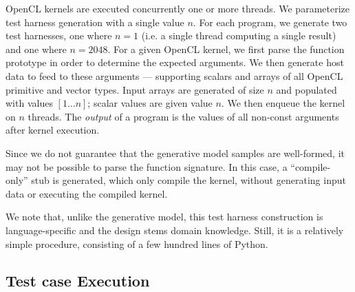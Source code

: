 OpenCL kernels are executed concurrently one or more threads. We parameterize test harness generation with a single value $n$. For each program, we generate two test harnesses, one where $n=1$ (i.e. a single thread computing a single result) and one where $n = 2048$. For a given OpenCL kernel, we first parse the function prototype in order to determine the expected arguments. We then generate host data to feed to these arguments --- supporting scalars and arrays of all OpenCL primitive and vector types. Input arrays are generated of size $n$ and populated with values {$[1 \ldots n]$}; scalar values are given value $n$. We then enqueue the kernel on $n$ threads. The \emph{output} of a program is the values of all non-const arguments after kernel execution.

Since we do not guarantee that the generative model samples are well-formed, it may not be possible to parse the function signature. In this case, a ``compile-only'' stub is generated, which only compile the kernel, without generating input data or executing the compiled kernel.

We note that, unlike the generative model, this test harness construction is language-specific and the design stems domain knowledge. Still, it is a relatively simple procedure, consisting of a few hundred lines of Python.



\subsection{Test case Execution}

